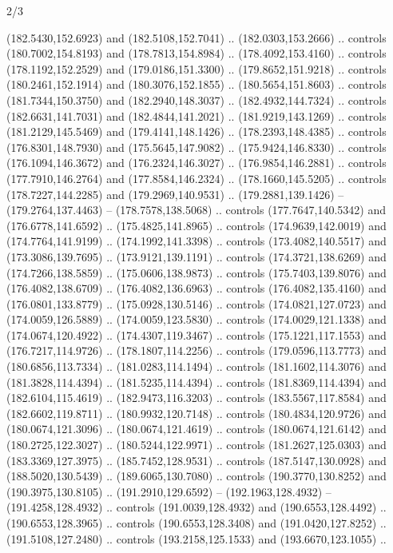 \begin{flagdescription}{2/3}
\begin{scope}[xshift=0.5\flaglength,yshift=0.5\flagwidth,scale=\flagwidth/180]
\begin{scope}[y=0.8pt, x=0.8pt, yscale=-1,shift={(-168.75,-108.75)}]
  (182.5430,152.6923) and (182.5108,152.7041) .. (182.0303,153.2666) .. controls
  (180.7002,154.8193) and (178.7813,154.8984) .. (178.4092,153.4160) .. controls
  (178.1192,152.2529) and (179.0186,151.3300) .. (179.8652,151.9218) .. controls
  (180.2461,152.1914) and (180.3076,152.1855) .. (180.5654,151.8603) .. controls
  (181.7344,150.3750) and (182.2940,148.3037) .. (182.4932,144.7324) .. controls
  (182.6631,141.7031) and (182.4844,141.2021) .. (181.9219,143.1269) .. controls
  (181.2129,145.5469) and (179.4141,148.1426) .. (178.2393,148.4385) .. controls
  (176.8301,148.7930) and (175.5645,147.9082) .. (175.9424,146.8330) .. controls
  (176.1094,146.3672) and (176.2324,146.3027) .. (176.9854,146.2881) .. controls
  (177.7910,146.2764) and (177.8584,146.2324) .. (178.1660,145.5205) .. controls
  (178.7227,144.2285) and (179.2969,140.9531) .. (179.2881,139.1426) --
  (179.2764,137.4463) -- (178.7578,138.5068) .. controls (177.7647,140.5342) and
  (176.6778,141.6592) .. (175.4825,141.8965) .. controls (174.9639,142.0019) and
  (174.7764,141.9199) .. (174.1992,141.3398) .. controls (173.4082,140.5517) and
  (173.3086,139.7695) .. (173.9121,139.1191) .. controls (174.3721,138.6269) and
  (174.7266,138.5859) .. (175.0606,138.9873) .. controls (175.7403,139.8076) and
  (176.4082,138.6709) .. (176.4082,136.6963) .. controls (176.4082,135.4160) and
  (176.0801,133.8779) .. (175.0928,130.5146) .. controls (174.0821,127.0723) and
  (174.0059,126.5889) .. (174.0059,123.5830) .. controls (174.0029,121.1338) and
  (174.0674,120.4922) .. (174.4307,119.3467) .. controls (175.1221,117.1553) and
  (176.7217,114.9726) .. (178.1807,114.2256) .. controls (179.0596,113.7773) and
  (180.6856,113.7334) .. (181.0283,114.1494) .. controls (181.1602,114.3076) and
  (181.3828,114.4394) .. (181.5235,114.4394) .. controls (181.8369,114.4394) and
  (182.6104,115.4619) .. (182.9473,116.3203) .. controls (183.5567,117.8584) and
  (182.6602,119.8711) .. (180.9932,120.7148) .. controls (180.4834,120.9726) and
  (180.0674,121.3096) .. (180.0674,121.4619) .. controls (180.0674,121.6142) and
  (180.2725,122.3027) .. (180.5244,122.9971) .. controls (181.2627,125.0303) and
  (183.3369,127.3975) .. (185.7452,128.9531) .. controls (187.5147,130.0928) and
  (188.5020,130.5439) .. (189.6065,130.7080) .. controls (190.3770,130.8252) and
  (190.3975,130.8105) .. (191.2910,129.6592) -- (192.1963,128.4932) --
  (191.4258,128.4932) .. controls (191.0039,128.4932) and (190.6553,128.4492) ..
  (190.6553,128.3965) .. controls (190.6553,128.3408) and (191.0420,127.8252) ..
  (191.5108,127.2480) .. controls (193.2158,125.1533) and (193.6670,123.1055) ..

\end{scope}
\end{scope}
\end{flagdescription}
